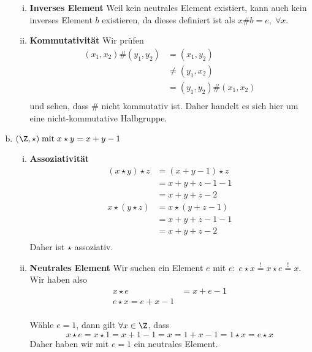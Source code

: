 \begin{enumerate}[a)]
\begin{enumerate}[i)]
      \item \textbf{Inverses Element} Weil kein neutrales Element existiert, kann auch kein inverses Element $b$ existieren, da dieses definiert ist als $x\# b = e, \; \forall x$.
      \item \textbf{Kommutativität}
      Wir prüfen
      \begin{align*}
        (x_1, x_2) \# (y_1, y_2) &= (x_1, y_2) \\
                                 &\neq (y_1, x_2) \\
                                 &= (y_1, y_2) \# (x_1, x_2) \\
      \end{align*}
      und sehen, dass $\#$ nicht kommutativ ist. Daher handelt es sich hier um eine nicht-kommutative Halbgruppe.
  \end{enumerate}
%
%
%
  \item $(\Z, \star) \; \text{mit} \; x \star y = x + y - 1$
    \begin{enumerate}[i)]
      \item \textbf{Assoziativität}
      \begin{align*}
        (x \star y) \star z &= (x + y - 1) \star z \\
                            &= x + y + z - 1 - 1 \\
                            &= x + y + z -2 \\
        x \star (y \star z) &= x \star (y + z -1) \\
                            &= x + y + z - 1 - 1 \\
                            &= x + y + z - 2 \\
              \end{align*}
        Daher ist $\star$ assoziativ.

    \item \textbf{Neutrales Element}
      Wir suchen ein Element $e$ mit $e: \; e \star x\overset{!}{=} x \star e \overset{!}{=} x$. Wir haben also
      \begin{align*}
        x \star e &= x + e - 1 \\
        e \star x = e + x - 1 \\
      \end{align*}

      Wähle $e=1$, dann gilt $ \forall x \in \Z  $, dass
      \[
        x \star e = x \star 1 = x + 1 - 1 = x = 1 + x - 1 = 1 \star x = e \star x
      \]
      Daher haben wir mit $e=1$ ein neutrales Element.


\end{enumerate}
\end{enumerate}
